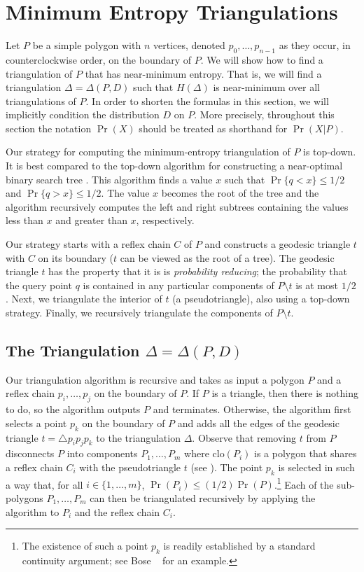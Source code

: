 \documentclass[acmtalg]{acmsmall}
\newcommand{\closure}{\mathrm{clo}}
\begin{document}
\section{Minimum Entropy Triangulations} 

Let $P$ be a simple polygon with $n$ vertices, denoted
$p_0,\ldots,p_{n-1}$ as they occur, in counterclockwise order, on the
boundary of $P$.  We will show how to find a triangulation of $P$ that
has near-minimum entropy.  That is, we will find a triangulation
$\Delta=\Delta(P,D)$ such that $H(\Delta)$ is near-minimum over all
triangulations of $P$.  In order to shorten the formulas in this
section, we will implicitly condition the distribution $D$ on $P$.
More precisely, throughout this section the notation $\Pr(X)$ should
be treated as shorthand for $\Pr(X|P)$.

Our strategy for computing the minimum-entropy triangulation of $P$ is
top-down.  It is best compared to the top-down algorithm for constructing
a near-optimal binary search tree \cite{m75}. This algorithm finds a
value $x$ such that $\Pr\{q < x\} \le 1/2$ and $\Pr\{q > x\}\le 1/2$.
The value $x$ becomes the root of the tree and the algorithm recursively
computes the left and right subtrees containing the values less than $x$
and greater than $x$, respectively.

Our strategy starts with a reflex chain $C$ of $P$ and constructs a
geodesic triangle $t$ with $C$ on its boundary ($t$ can be viewed as the
root of a tree).  The geodesic triangle $t$ has the property that it is
is \emph{probability reducing}; the probability that the query point $q$
is contained in any particular components of $P\setminus t$ is at most
$1/2$.  Next, we triangulate the interior of $t$ (a pseudotriangle),
also using a top-down strategy.  Finally, we recursively triangulate
the components of $P\setminus t$.

\subsection{The Triangulation $\Delta=\Delta(P,D)$}

Our triangulation algorithm is recursive and takes as input a polygon
$P$ and a reflex chain $p_i,\ldots,p_j$ on the boundary of $P$.  If
$P$ is a triangle, then there is nothing to do, so the algorithm
outputs $P$ and terminates. Otherwise, the
algorithm first selects a point $p_k$ on the boundary of $P$ and adds
all the edges of the geodesic triangle $t=\triangle p_ip_jp_k$ to the
triangulation $\Delta$.
Observe that removing $t$ from $P$ disconnects $P$ into
components $P_1,\ldots,P_m$ where $\closure(P_i)$ is a polygon that shares a
reflex chain $C_i$ with the pseudotriangle $t$ (see
).  The point
$p_k$ is selected in such a way that, for all $i\in\{1,\ldots,m\}$, $\Pr(P_i)
\le (1/2)\Pr(P)$.\footnote{The existence of such a point $p_k$ is
readily established by a standard continuity argument; see Bose \etal\
\cite{bdhlim07} for an example.} Each of the sub-polygons $P_1,\ldots,P_m$
can then be triangulated recursively by applying the algorithm to
$P_i$ and the reflex chain $C_i$.
\end{document}
